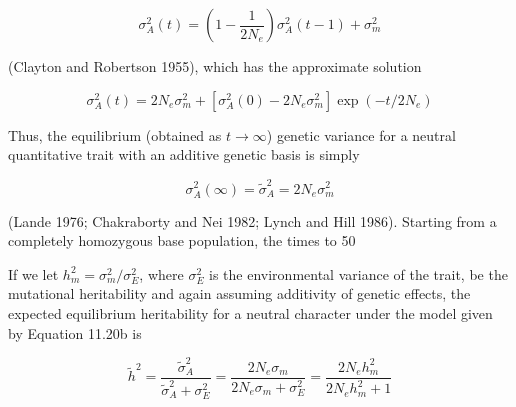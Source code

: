 \documentclass{article}
\begin{document}
\begin{equation}
\sigma_{A}^{2}(t)=\left(1-\frac{1}{2N_{e}}\right)\sigma_{A}^{2}(t-1)+\sigma_{m}^{2}
\tag{11.20a}
\label{eq:11_20a}
\end{equation}

(Clayton and Robertson 1955), which has the approximate solution

\begin{equation}
\sigma_{A}^{2}(t)=2N_{e}\sigma_{m}^{2}+[\sigma_{A}^{2}(0)-2N_{e}\sigma_{m}^{2}]\exp(-t/2N_{e})
\tag{11.20b}
\label{eq:11_20b}
\end{equation}

Thus, the equilibrium (obtained as  $ t \to \infty $) genetic variance for a neutral quantitative trait with an additive genetic basis is simply

\begin{equation}
\sigma_{A}^{2}(\infty)=\widetilde{\sigma}_{A}^{2}=2N_{e}\sigma_{m}^{2}
\tag{11.20c}
\label{eq:11_20c}
\end{equation}

(Lande 1976; Chakraborty and Nei 1982; Lynch and Hill 1986). Starting from a completely homozygous base population, the times to 50%

If we let  $ h_m^2 = \sigma_m^2 / \sigma_E^2 $, where  $ \sigma_E^2 $ is the environmental variance of the trait, be the mutational heritability and again assuming additivity of genetic effects, the expected equilibrium heritability for a neutral character under the model given by Equation 11.20b is

\begin{equation}
\widetilde{h}^{2}=\frac{\widetilde{\sigma}_{A}^{2}}{\widetilde{\sigma}_{A}^{2}+\sigma_{E}^{2}}=\frac{2N_{e}\sigma_{m}}{2N_{e}\sigma_{m}+\sigma_{E}^{2}}=\frac{2N_{e}h_{m}^{2}}{2N_{e}h_{m}^{2}+1}
\tag{11.21a}
\label{eq:11_21a}
\end{equation}
\end{document}
